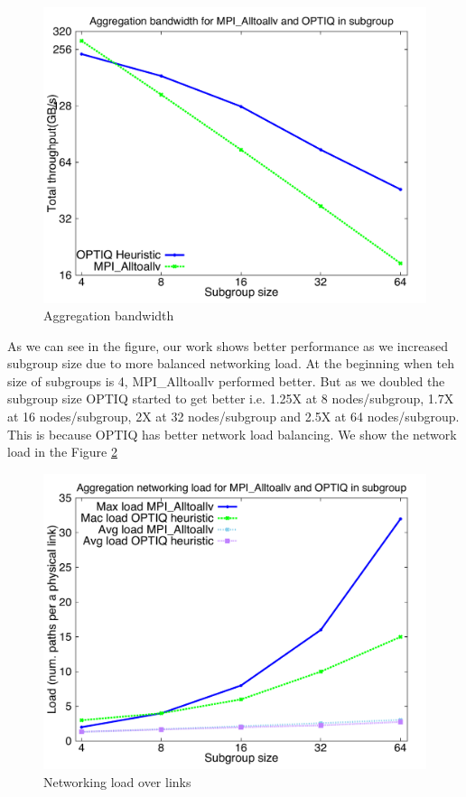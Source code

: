 \begin{figure}[!htb]
\vspace{-0.1in}
\centering
\includegraphics[scale=0.30]{figures/agg.pdf}
\vspace{-0.1in}
\caption{Aggregation bandwidth}
\vspace{-0.1in}
\label{fig:aggbw}
\end{figure}

As we can see in the figure, our work shows better performance as we increased subgroup size due to more balanced networking load. At the beginning when teh size of subgroups is 4, MPI\_Alltoallv performed better. But as we doubled the subgroup size OPTIQ started to get better i.e. 1.25X at 8 nodes/subgroup, 1.7X at 16 nodes/subgroup, 2X at 32 nodes/subgroup and 2.5X at 64 nodes/subgroup. This is because OPTIQ has better network load balancing. We show the network load in the Figure \ref{fig:aggload}

\begin{figure}[!htb]
\vspace{-0.1in}
\centering
\includegraphics[scale=0.30]{figures/load.pdf}
\vspace{-0.1in}
\caption{Networking load over links}
\vspace{-0.1in}
\label{fig:aggload}
\end{figure}

